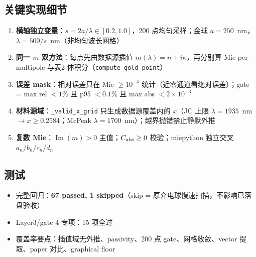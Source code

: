 \subsection{关键实现细节}

\begin{enumerate}
  \item \textbf{横轴独立变量}：$s = 2a/\lambda \in [0.2, 1.0]$，200 点均匀采样；金球 $a=250$~nm，$\lambda = 500/s$~nm（非均匀波长网格）
  \item \textbf{同一 $m$ 双方法}：每点先由数据源插值 $m(\lambda) = n+i\kappa$，再分别算 Mie per-multipole 与表2 体积分（\texttt{compute\_gold\_point}）
  \item \textbf{误差 mask}：相对误差只在 Mie $\geq 10^{-4}$ 统计（近零通道看绝对误差）；gate = max rel $<1\%$ 且 p95 $<0.1\%$ 且 max abs $<2\times10^{-3}$
  \item \textbf{材料源域}：\texttt{\_valid\_x\_grid} 只生成数据源覆盖内的 $x$（JC 上限 $\lambda=1935$~nm $\rightarrow x\geq0.2584$；McPeak $\lambda=1700$~nm）；越界抛错禁止静默外推
  \item \textbf{复数 Mie}：$\operatorname{Im}(m)>0$ 主值；$C_{\rm abs}\geq0$ 校验；miepython 独立交叉 $a_n/b_n/c_n/d_n$
\end{enumerate}

\subsection{测试}

\begin{itemize}
  \item 完整回归：\textbf{67 passed, 1 skipped}（skip = 原介电球慢速扫描，不影响已落盘验收）
  \item Layer3/gate 4 专项：15 项全过
  \item 覆盖率要点：插值域无外推、passivity、200 点 gate、网格收敛、vector 提取、paper 对比、graphical floor
\end{itemize}
